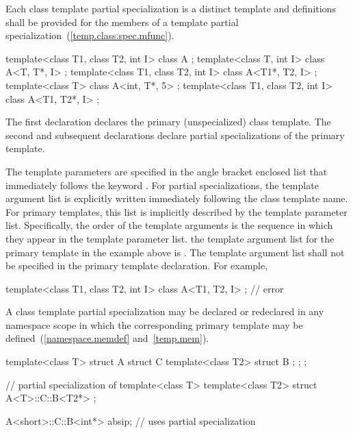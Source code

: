 \pnum
Each class template partial specialization is a distinct template and
definitions shall be provided for the members of a template partial
specialization~(\ref{temp.class.spec.mfunc}).

\pnum
\enterexample
\begin{codeblock}
template<class T1, class T2, int I> class A             { };
template<class T, int I>            class A<T, T*, I>   { };
template<class T1, class T2, int I> class A<T1*, T2, I> { };
template<class T>                   class A<int, T*, 5> { };
template<class T1, class T2, int I> class A<T1, T2*, I> { };
\end{codeblock}

The first declaration declares the primary (unspecialized) class template.
The second and subsequent declarations declare partial specializations of
the primary template.
\exitexample

\pnum
The template parameters are specified in the angle bracket enclosed list
that immediately follows the keyword
.
For partial specializations, the template argument list is explicitly
written immediately following the class template name.
For primary templates, this list is implicitly described by the
template parameter list.
Specifically, the order of the template arguments is the sequence in
which they appear in the template parameter list.
\enterexample
the template argument list for the primary template in the example
above is
.
\exitexample
\enternote
The template argument list shall not be specified in the primary template
declaration.
For example,

\begin{codeblock}
template<class T1, class T2, int I> class A<T1, T2, I>  { };    // error
\end{codeblock}
\exitnote

\pnum
A class template partial specialization may be declared or redeclared in any
namespace scope in which the corresponding primary template
may be defined~(\ref{namespace.memdef} and~\ref{temp.mem}).
\enterexample

\begin{codeblock}
template<class T> struct A {
  struct C {
    template<class T2> struct B { };
  };
};

// partial specialization of 
template<class T> template<class T2>
  struct A<T>::C::B<T2*> { };

A<short>::C::B<int*> absip;     // uses partial specialization
\end{codeblock}
\exitexample

